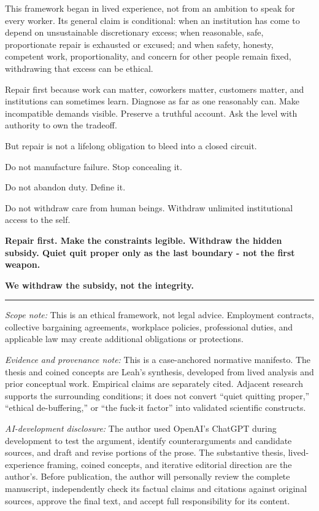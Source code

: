 \documentclass[11pt,oneside]{article}
\begin{document}
This framework began in lived experience, not from an ambition to speak
for every worker. Its general claim is conditional: when an institution
has come to depend on unsustainable discretionary excess; when
reasonable, safe, proportionate repair is exhausted or excused; and when
safety, honesty, competent work, proportionality, and concern for other
people remain fixed, withdrawing that excess can be ethical.

Repair first because work can matter, coworkers matter, customers
matter, and institutions can sometimes learn. Diagnose as far as one
reasonably can. Make incompatible demands visible. Preserve a truthful
account. Ask the level with authority to own the tradeoff.

But repair is not a lifelong obligation to bleed into a closed circuit.

Do not manufacture failure. Stop concealing it.

Do not abandon duty. Define it.

Do not withdraw care from human beings. Withdraw unlimited institutional
access to the self.

\textbf{Repair first. Make the constraints legible. Withdraw the hidden
subsidy. Quiet quit proper only as the last boundary - not the first
weapon.}

\textbf{We withdraw the subsidy, not the integrity.}

\begin{center}\rule{0.5\linewidth}{0.5pt}\end{center}

\emph{Scope note:} This is an ethical framework, not legal advice.
Employment contracts, collective bargaining agreements, workplace
policies, professional duties, and applicable law may create additional
obligations or protections.

\emph{Evidence and provenance note:} This is a case-anchored normative
manifesto. The thesis and coined concepts are Leah's synthesis,
developed from lived analysis and prior conceptual work. Empirical
claims are separately cited. Adjacent research supports the surrounding
conditions; it does not convert ``quiet quitting proper,'' ``ethical
de-buffering,'' or ``the fuck-it factor'' into validated scientific
constructs.

\emph{AI-development disclosure:} The author used OpenAI's ChatGPT
during development to test the argument, identify counterarguments and
candidate sources, and draft and revise portions of the prose. The
substantive thesis, lived-experience framing, coined concepts, and
iterative editorial direction are the author's. Before publication, the
author will personally review the complete manuscript, independently
check its factual claims and citations against original sources, approve
the final text, and accept full responsibility for its content.

\clearpage
\begingroup
\sloppy
\theendnotes
\endgroup
\end{document}
